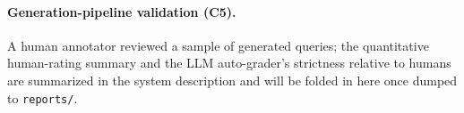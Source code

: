 \documentclass[11pt]{article}
\begin{document}
\paragraph{Generation-pipeline validation (C5).}
A human annotator reviewed a sample of generated queries; the quantitative
human-rating summary and the LLM auto-grader's strictness relative to humans are
summarized in the system description and will be folded in here once dumped to
\texttt{reports/}.
\end{document}
